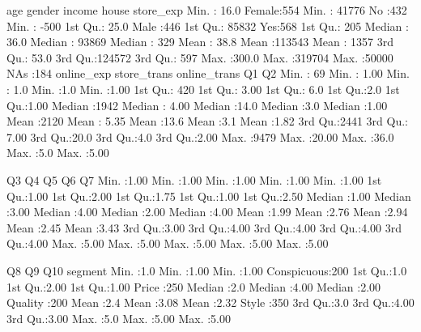 \documentclass[
  12pt,
]{krantz}
\makeatletter
\newenvironment{Shaded}{\begin{snugshade}}{\end{snugshade}}
\newcommand{\NormalTok}[1]{#1}
\newenvironment{kframe}{%
\medskip{}
\setlength{\fboxsep}{.8em}
 \def\at@end@of@kframe{}%
 \ifinner\ifhmode%
  \def\at@end@of@kframe{\end{minipage}}%
  \begin{minipage}{\columnwidth}%
 \fi\fi%
 \def\FrameCommand##1{\hskip\@totalleftmargin \hskip-\fboxsep
 \colorbox{shadecolor}{##1}\hskip-\fboxsep
     \hskip-\linewidth \hskip-\@totalleftmargin \hskip\columnwidth}%
 \MakeFramed {\advance\hsize-\width
   \@totalleftmargin\z@ \linewidth\hsize
   \@setminipage}}%
 {\par\unskip\endMakeFramed%
 \at@end@of@kframe}
\renewenvironment{Shaded}{\begin{kframe}}{\end{kframe}}
\makeatother
\begin{document}
\begin{Shaded}
\begin{Highlighting}[]
\NormalTok{      age           gender        income       house       store\_exp    }
\NormalTok{ Min.   : 16.0   Female:554   Min.   : 41776   No :432   Min.   : {-}500  }
\NormalTok{ 1st Qu.: 25.0   Male  :446   1st Qu.: 85832   Yes:568   1st Qu.:  205  }
\NormalTok{ Median : 36.0                Median : 93869             Median :  329  }
\NormalTok{ Mean   : 38.8                Mean   :113543             Mean   : 1357  }
\NormalTok{ 3rd Qu.: 53.0                3rd Qu.:124572             3rd Qu.:  597  }
\NormalTok{ Max.   :300.0                Max.   :319704             Max.   :50000  }
\NormalTok{                              NA\textquotesingle{}s   :184                               }
\NormalTok{   online\_exp    store\_trans     online\_trans        Q1            Q2      }
\NormalTok{ Min.   :  69   Min.   : 1.00   Min.   : 1.0   Min.   :1.0   Min.   :1.00  }
\NormalTok{ 1st Qu.: 420   1st Qu.: 3.00   1st Qu.: 6.0   1st Qu.:2.0   1st Qu.:1.00  }
\NormalTok{ Median :1942   Median : 4.00   Median :14.0   Median :3.0   Median :1.00  }
\NormalTok{ Mean   :2120   Mean   : 5.35   Mean   :13.6   Mean   :3.1   Mean   :1.82  }
\NormalTok{ 3rd Qu.:2441   3rd Qu.: 7.00   3rd Qu.:20.0   3rd Qu.:4.0   3rd Qu.:2.00  }
\NormalTok{ Max.   :9479   Max.   :20.00   Max.   :36.0   Max.   :5.0   Max.   :5.00  }
                                                                           
\NormalTok{       Q3             Q4             Q5             Q6             Q7      }
\NormalTok{ Min.   :1.00   Min.   :1.00   Min.   :1.00   Min.   :1.00   Min.   :1.00  }
\NormalTok{ 1st Qu.:1.00   1st Qu.:2.00   1st Qu.:1.75   1st Qu.:1.00   1st Qu.:2.50  }
\NormalTok{ Median :1.00   Median :3.00   Median :4.00   Median :2.00   Median :4.00  }
\NormalTok{ Mean   :1.99   Mean   :2.76   Mean   :2.94   Mean   :2.45   Mean   :3.43  }
\NormalTok{ 3rd Qu.:3.00   3rd Qu.:4.00   3rd Qu.:4.00   3rd Qu.:4.00   3rd Qu.:4.00  }
\NormalTok{ Max.   :5.00   Max.   :5.00   Max.   :5.00   Max.   :5.00   Max.   :5.00  }
                                                                           
\NormalTok{       Q8            Q9            Q10              segment   }
\NormalTok{ Min.   :1.0   Min.   :1.00   Min.   :1.00   Conspicuous:200  }
\NormalTok{ 1st Qu.:1.0   1st Qu.:2.00   1st Qu.:1.00   Price      :250  }
\NormalTok{ Median :2.0   Median :4.00   Median :2.00   Quality    :200  }
\NormalTok{ Mean   :2.4   Mean   :3.08   Mean   :2.32   Style      :350  }
\NormalTok{ 3rd Qu.:3.0   3rd Qu.:4.00   3rd Qu.:3.00                    }
\NormalTok{ Max.   :5.0   Max.   :5.00   Max.   :5.00                    }
\end{Highlighting}
\end{Shaded}
\end{document}
